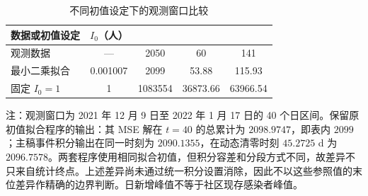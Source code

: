 \documentclass[lang=cn,a4paper,newtx]{elegantpaper}
\begin{document}
\clearpage
\begin{table}[htbp]
\centering\small
\setlength{\tabcolsep}{3.5pt}
\begin{threeparttable}
\caption{不同初值设定下的观测窗口比较}
\label{tab:sup:initial}
\begin{tabular*}{\linewidth}{@{\extracolsep{\fill}}lS[table-format=1.6]S[table-format=7.0]S[table-format=5.2]S[table-format=5.2]@{}}
\toprule
数据或初值设定 & {$I_0$（人）} & {} & {} & {}\\
\midrule
观测数据 & {---} & 2050 & 60 & 141\\
最小二乘拟合 & 0.001007 & 2099 & 53.88 & 115.93\\
固定 $I_0=1$ & 1 & 1083554 & 36873.66 & 63966.54\\
\bottomrule
\end{tabular*}
\begin{tablenotes}[flushleft]\footnotesize
\item 注：观测窗口为 2021 年 12 月 9 日至 2022 年 1 月 17 日的 40 个日区间。保留原初值拟合程序的输出：其 MSE 解在 $t=40$ 的总累计为 $2098.9747$，即表内 $2099$；主稿事件积分输出在同一时刻为 $2090.1355$，在动态清零时刻 $45.2725$ d 为 $2096.7578$。两套程序使用相同拟合初值，但积分容差和分段方式不同，故差异不只来自统计终点。上述差异尚未通过统一积分设置消除，因此不以这些参照值的末位差异作精确的边界判断。日新增峰值不等于社区现存感染者峰值。
\end{tablenotes}
\end{threeparttable}
\end{table}
\clearpage
\end{document}
